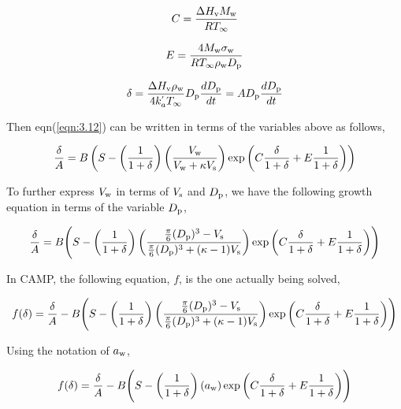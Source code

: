 \documentclass[12pt]{article}
\begin{document}
\begin{equation}\label{eqn:5.5}
C=\frac{\Delta H_{\rm v} M_{\rm w}}{R T_{\infty}}
\end{equation}

\begin{equation}\label{eqn:5.6}
E=\frac{4 M_{\rm w}\sigma_{\rm w}}{R T_{\infty} \rho_{\rm w} D_{\rm p}}
\end{equation}

\begin{equation}\label{eqn:5.7}
\delta=\frac{\Delta H_{\rm v} \rho_{\rm w}}{4 k_a^{'} T_{\infty}} D_{\rm p} \frac{d D_{\rm p}}{dt}=A D_{\rm p} \frac{d D_{\rm p}}{dt}
\end{equation}

Then eqn(\ref{eqn:3.12}) can be written in terms of the variables above as follows,

\begin{equation}\label{eqn:5.8}
\frac{\delta}{A}=B \left(S-\left(\frac{1}{1+\delta}\right) \left(\frac{V_{\rm w}}{V_{\rm w}+\kappa V_{\rm s}}\right)\exp{\left(C \frac{\delta}{1+\delta} +E \frac{1}{1+\delta}\right)}\right)
\end{equation}

To further express $V_{\rm w}$ in terms of $V_{\rm s}$ and $ D_{\rm p}$, we have the following growth equation in terms of the variable $D_{\rm p}$,

\begin{equation}\label{eqn:5.9}
\frac{\delta}{A}=B \Bigg(S-\left(\frac{1}{1+\delta}\right) \left(\frac{\frac{\pi}{6}(D_{\rm p})^{3}-V_{\rm s}} {\frac{\pi}{6}(D_{\rm p})^{3}+(\kappa-1)V_{\rm s}}\right)\exp{\left(C \frac{\delta}{1+\delta} +E \frac{1}{1+\delta}\right)} \Bigg)
\end{equation}

In CAMP, the following equation, $f$, is the one actually being solved,

\begin{equation}\label{eqn:5.10}
f(\delta)=\frac{\delta}{A}-B \Bigg(S-\left(\frac{1}{1+\delta}\right) \left(\frac{\frac{\pi}{6}(D_{\rm p})^{3}-V_{\rm s}} {\frac{\pi}{6}(D_{\rm p})^{3}+(\kappa-1)V_{\rm s}}\right)\exp{\left(C \frac{\delta}{1+\delta} +E \frac{1}{1+\delta}\right)} \Bigg)
\end{equation}

Using the notation of $a_{\rm w}$,

\begin{equation}\label{eqn:5.11}
f(\delta)=\frac{\delta}{A}-B \Bigg(S-\left(\frac{1}{1+\delta}\right) (a_{\rm w}) \exp{\left(C \frac{\delta}{1+\delta} +E \frac{1}{1+\delta}\right)} \Bigg)
\end{equation}
\end{document}
